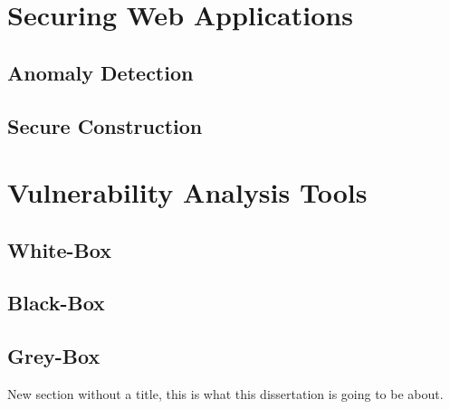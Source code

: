 \section{Securing Web Applications}

\subsection{Anomaly Detection}

\subsection{Secure Construction}

\section{Vulnerability Analysis Tools}

\subsection{White-Box}

\subsection{Black-Box}

\subsection{Grey-Box}



New section without a title, this is what this dissertation is going
to be about.







